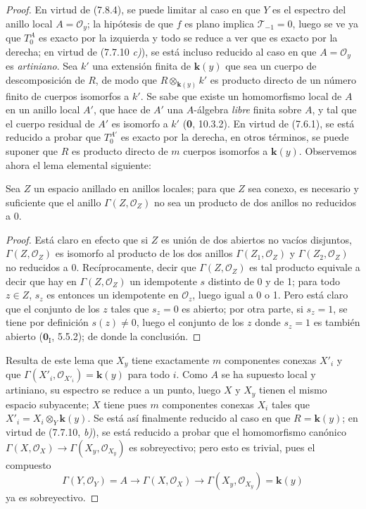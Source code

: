 \begin{proof}
En virtud de (7.8.4), se puede limitar al caso en que $Y$ es el espectro del anillo
local $A=\mathscr O_y$; la hipótesis de que $f$ es plano implica
$\mathscr T_{-1}=0$, luego se ve ya que $T_0^A$ es exacto por la izquierda y todo
se reduce a ver que es exacto por la derecha; en virtud de (7.7.10 \emph{c)}), se está incluso
reducido al caso en que $A=\mathscr O_y$ es \emph{artiniano}. Sea $k'$ una extensión
finita de $\boldsymbol{k}(y)$ que sea un cuerpo de descomposición de $R$, de modo que
$R\otimes_{\mathbf{k}(y)}k'$ es producto directo de un número finito de cuerpos
isomorfos a $k'$. Se sabe que existe un homomorfismo local de $A$ en un
anillo local $A'$, que hace de $A'$ una $A$-álgebra \emph{libre} finita sobre $A$,
y tal que el cuerpo residual de $A'$ es isomorfo a $k'$ (\textbf{0},
10.3.2). En virtud de (7.6.1), se está reducido a probar que $T_0^{A'}$ es exacto
por la derecha, en otros términos, se puede suponer que $R$ es producto directo de $m$
cuerpos isomorfos a $\boldsymbol{k}(y)$. Observemos ahora el lema elemental
siguiente:

\begin{lemma}[7.8.6.1]
Sea $Z$ un espacio anillado en anillos locales; para que $Z$ sea conexo,
es necesario y suficiente que el anillo $\Gamma(Z,\mathscr O_Z)$ no sea un producto
de dos anillos no reducidos a 0.
\end{lemma}

\begin{proof}
Está claro en efecto que si $Z$ es unión de dos abiertos no vacíos disjuntos,
$\Gamma(Z,\mathscr O_Z)$ es isomorfo al producto de los dos anillos
$\Gamma(Z_1,\mathscr O_Z)$ y $\Gamma(Z_2,\mathscr O_Z)$ no reducidos a 0.
Recíprocamente, decir que $\Gamma(Z,\mathscr O_Z)$ es tal producto equivale a
decir que hay en $\Gamma(Z,\mathscr O_Z)$ un idempotente $s$ distinto de 0 y
de 1; para todo $z\in Z$, $s_z$ es entonces un idempotente en $\mathscr O_z$,
luego igual a 0 o 1. Pero está claro que el conjunto de los $z$ tales que $s_z=0$
es abierto; por otra parte, si $s_z=1$, se tiene por definición $s(z)\ne0$, luego
el conjunto de los $z$ donde $s_z=1$ es también abierto ($\mathbf{0}_{\mathrm I}$, 5.5.2); de donde
la conclusión.
\end{proof}

Resulta de este lema que $X_y$ tiene exactamente $m$ componentes conexas $X'_i$
y que $\Gamma(X'_i,\mathscr O_{X'_i})=\boldsymbol{k}(y)$ para todo $i$. Como $A$ se ha
supuesto local y artiniano, su espectro se reduce a un punto, luego $X$ y $X_y$
tienen el mismo espacio subyacente; $X$ tiene pues $m$ componentes conexas $X_i$ tales
que $X'_i=X_i\otimes_Y\boldsymbol{k}(y)$. Se está así finalmente reducido al caso en que
$R=\boldsymbol{k}(y)$; en virtud de (7.7.10, \emph{b)}), se está reducido a probar que
el homomorfismo canónico
$\Gamma(X,\mathscr O_X)\to\Gamma(X_y,\mathscr O_{X_y})$
es sobreyectivo; pero esto es trivial, pues el compuesto
\[
  \Gamma(Y,\mathscr O_Y)=A
  \longrightarrow
  \Gamma(X,\mathscr O_X)
  \longrightarrow
  \Gamma(X_y,\mathscr O_{X_y})=\boldsymbol{k}(y)
\]
ya es sobreyectivo.
\end{proof}

